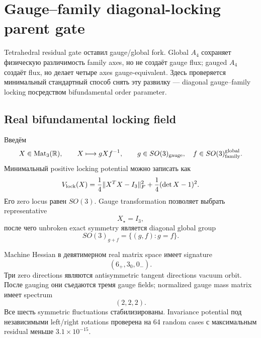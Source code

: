 \chapter{Gauge--family diagonal-locking parent gate}

Tetrahedral residual gate оставил gauge/global fork. Global \(A_4\)
сохраняет физическую различимость family axes, но не создаёт gauge flux;
gauged \(A_4\) создаёт flux, но делает четыре axes gauge-equivalent. Здесь
проверяется минимальный стандартный способ снять эту развилку ---
diagonal gauge--family locking посредством bifundamental order parameter.

\section{Real bifundamental locking field}

Введём
\begin{equation}
 X\in\operatorname{Mat}_3(\mathbb R),
 \qquad
 X\longmapsto gXf^{-1},
 \qquad
 g\in SO(3)_{\rm gauge},\quad
 f\in SO(3)_{\rm family}^{\rm global}.
 \label{eq:gauge-family-bifundamental}
\end{equation}
Минимальный positive locking potential можно записать как
\begin{equation}
 V_{\rm lock}(X)
 =\frac14\|X^TX-I_3\|_F^2
 +\frac14(\det X-1)^2.
 \label{eq:real-bifundamental-locking-potential}
\end{equation}
Его zero locus равен \(SO(3)\). Gauge transformation позволяет выбрать
representative
\begin{equation}
 X_\star=I_3,
\end{equation}
после чего unbroken exact symmetry является diagonal global group
\begin{equation}
 SO(3)_{g+f}=\{(g,f):g=f\}.
 \label{eq:diagonal-family-group}
\end{equation}

Machine Hessian в девятимерном real matrix space имеет signature
\begin{equation}
 (6_+,3_0,0_-).
\end{equation}
Три zero directions являются antisymmetric tangent directions vacuum
orbit. После gauging они съедаются тремя gauge fields; normalized gauge
mass matrix имеет spectrum
\begin{equation}
 (2,2,2).
\end{equation}
Все шесть symmetric fluctuations стабилизированы. Invariance potential
под независимыми left/right rotations проверена на 64 random cases с
максимальным residual меньше \(3.1\times10^{-15}\).

